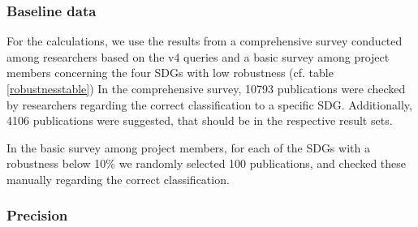 \documentclass{article}
\begin{document}
\subsubsection{Baseline data}
 
For the calculations, we use the results from a comprehensive survey conducted among researchers based on the v4 queries \cite{vanderfeesten_survey_2020} and a basic survey among project members concerning the four SDGs with low robustness (cf. table \ref{robustnesstable})
In the comprehensive survey, 10793 publications were checked by researchers regarding the correct classification to a specific SDG. Additionally, 4106 publications were suggested, that should be in the respective result sets.

In the basic survey among project members, for each of the SDGs with a robustness below 10\% we randomly selected 100 publications, and checked these manually regarding the correct classification.

\subsubsection{Precision}
\end{document}
